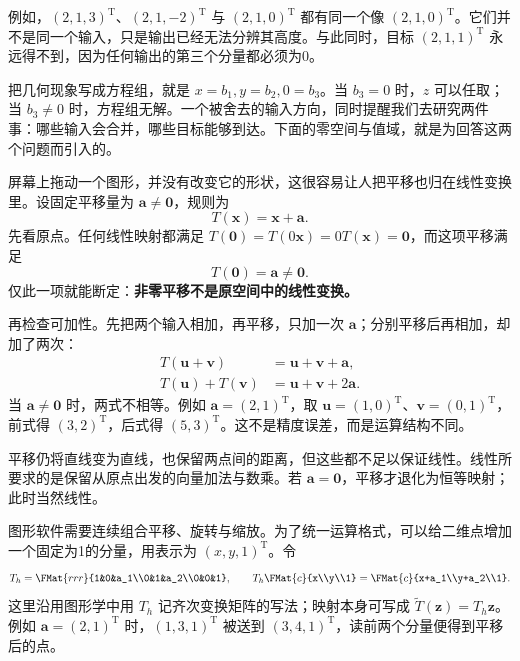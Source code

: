 \documentclass[a4paper,12pt,twoside,openany,fontset=none]{ctexbook}
\numberwithin{equation}{chapter}
\begin{document}
例如，$(2,1,3)^{\mathrm T}$、$(2,1,-2)^{\mathrm T}$ 与 $(2,1,0)^{\mathrm T}$ 都有同一个像 $(2,1,0)^{\mathrm T}$。它们并不是同一个输入，只是输出已经无法分辨其高度。与此同时，目标 $(2,1,1)^{\mathrm T}$ 永远得不到，因为任何输出的第三个分量都必须为0。

把几何现象写成方程组，就是 $x=b_1,y=b_2,0=b_3$。当 $b_3=0$ 时，$z$ 可以任取；当 $b_3\ne0$ 时，方程组无解。一个被舍去的输入方向，同时提醒我们去研究两件事：哪些输入会合并，哪些目标能够到达。下面的零空间与值域，就是为回答这两个问题而引入的。

屏幕上拖动一个图形，并没有改变它的形状，这很容易让人把平移也归在线性变换里。设固定平移量为 $\boldsymbol a\ne\boldsymbol0$，规则为
\[
 T(\boldsymbol x)=\boldsymbol x+\boldsymbol a.
\]
先看原点。任何线性映射都满足 $T(\boldsymbol0)=T(0\boldsymbol x)=0T(\boldsymbol x)=\boldsymbol0$，而这项平移满足
\[
 T(\boldsymbol0)=\boldsymbol a\ne\boldsymbol0.
\]
仅此一项就能断定：\textbf{非零平移不是原空间中的线性变换。}

再检查可加性。先把两个输入相加，再平移，只加一次 $\boldsymbol a$；分别平移后再相加，却加了两次：
\[
 \begin{aligned}
 T(\boldsymbol u+\boldsymbol v)&=\boldsymbol u+\boldsymbol v+\boldsymbol a,\\
 T(\boldsymbol u)+T(\boldsymbol v)&=\boldsymbol u+\boldsymbol v+2\boldsymbol a.
 \end{aligned}
\]
当 $\boldsymbol a\ne\boldsymbol0$ 时，两式不相等。例如 $\boldsymbol a=(2,1)^{\mathrm T}$，取 $\boldsymbol u=(1,0)^{\mathrm T}$、$\boldsymbol v=(0,1)^{\mathrm T}$，前式得 $(3,2)^{\mathrm T}$，后式得 $(5,3)^{\mathrm T}$。这不是精度误差，而是运算结构不同。

平移仍将直线变为直线，也保留两点间的距离，但这些都不足以保证线性。线性所要求的是保留从原点出发的向量加法与数乘。若 $\boldsymbol a=\boldsymbol0$，平移才退化为恒等映射；此时当然线性。

图形软件需要连续组合平移、旋转与缩放。为了统一运算格式，可以给二维点增加一个固定为1的分量，用表示为 $(x,y,1)^{\mathrm T}$。令
\[
 T_h=\FMat{rrr}{1&0&a_1\\0&1&a_2\\0&0&1},\qquad
 T_h\FMat{c}{x\\y\\1}=\FMat{c}{x+a_1\\y+a_2\\1}.
\]
这里沿用图形学中用 $T_h$ 记齐次变换矩阵的写法；映射本身可写成 $\widetilde T(\boldsymbol z)=T_h\boldsymbol z$。例如 $\boldsymbol a=(2,1)^{\mathrm T}$ 时，$(1,3,1)^{\mathrm T}$ 被送到 $(3,4,1)^{\mathrm T}$，读前两个分量便得到平移后的点。
\end{document}
